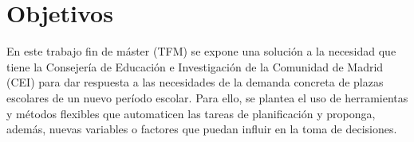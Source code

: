 \section{Objetivos} 
\label{objetivos}
En este trabajo fin de máster (TFM) se expone una solución a la necesidad que tiene la Consejería de Educación e Investigación de la Comunidad de Madrid (CEI) para dar respuesta a las necesidades de la demanda concreta de plazas escolares de un nuevo período escolar. Para ello, se plantea el uso de herramientas y métodos flexibles que automaticen las tareas de planificación y proponga, además, nuevas variables o factores que puedan influir en la toma de decisiones. 

